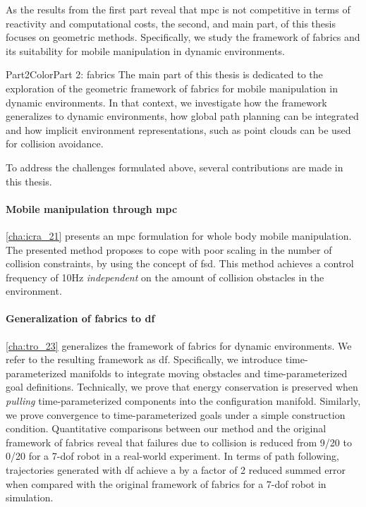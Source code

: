 As the results from the first part reveal that \ac{mpc} is 
not competitive in terms of reactivity and computational
costs, the second, and main part, of this thesis focuses on
geometric methods. Specifically, we study the framework
of \acl{fabrics} and its suitability for mobile manipulation
in dynamic environments.
%
\begin{textbox}{Part2Color}{Part 2: \acl{fabrics}}
  The main part of this thesis is dedicated to the
  exploration of the geometric framework of \ac{fabrics} for
  mobile manipulation in dynamic environments. In that
  context, we investigate how the framework generalizes to
  dynamic environments, how global path planning can be
  integrated and how implicit environment representations,
  such as point clouds can be used for collision avoidance.
\end{textbox}

To address the challenges formulated above, several
contributions are made in this thesis.

\paragraph{Mobile manipulation through \ac{mpc}}
\cref{cha:icra_21} presents an \ac{mpc} formulation for
whole body mobile manipulation. The presented method proposes to cope
with poor scaling in the number of collision constraints, by
using the concept of \acf{fsd}. This method achieves a
control frequency of 10Hz \textit{independent} on the amount
of collision obstacles in the environment.

\paragraph{Generalization of \ac{fabrics} to \ac{df}}
\cref{cha:tro_23} generalizes the framework of \ac{fabrics}
for dynamic environments. We refer to the resulting
framework as \ac{df}. Specifically, we introduce
time\hyp{}parameterized manifolds to integrate moving
obstacles and time\hyp{}parameterized goal definitions.
Technically,
we prove that energy conservation is preserved when
\textit{pulling} time\hyp{}parameterized components into
the configuration manifold. 
Similarly, we prove convergence to
time\hyp{}parameterized goals under a simple construction
condition. Quantitative comparisons between our method
and the original framework of \ac{fabrics} reveal
that failures due to collision is reduced from 9/20
to 0/20 for a 7-\ac{dof} robot in a real-world experiment.
In terms of path following, trajectories generated
with \ac{df} achieve a by a factor of 2 reduced summed error 
when compared with the original framework of
\ac{fabrics} for a 7-\ac{dof} robot in simulation.



